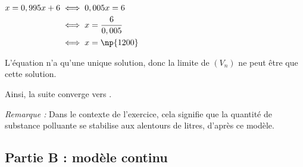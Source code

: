 \begin{enumerate}
	$\begin{aligned}
		x = 0,995x + 6
		&\iff 0,005x = 6\\
		&\iff x = \dfrac{6}{0,005}\\
		&\iff x = \np{1200}
	\end{aligned}$

	L'équation n'a qu'une unique solution, donc la limite de $(V_n)$ ne peut être que cette solution.

	Ainsi, la suite converge vers .

	\emph{Remarque :} Dans le contexte de l'exercice, cela signifie que la quantité de substance polluante se stabilise aux alentours de  litres, d'après ce modèle.
\end{enumerate}

\subsection*{Partie B : modèle continu}
